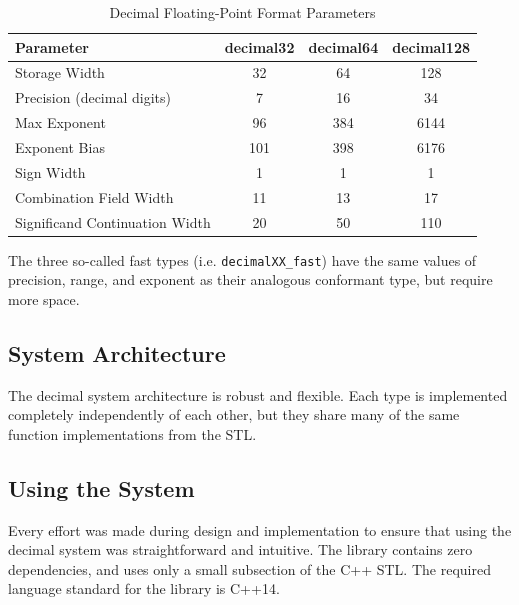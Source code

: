 \documentclass[acmsmall]{acmart}
\newcommand{\code}[1]{\texttt{#1}}
\begin{document}
\begin{table}[H]
\centering
\begin{tabular}{|l|c|c|c|}
\hline
\textbf{Parameter} & \textbf{decimal32} & \textbf{decimal64} & \textbf{decimal128} \\
\hline
Storage Width & 32 & 64 & 128 \\
\hline
Precision (decimal digits) & 7 & 16 & 34 \\
\hline
Max Exponent & 96 & 384 & 6144 \\
\hline
Exponent Bias & 101 & 398 & 6176 \\
\hline
Sign Width & 1 & 1 & 1 \\
\hline
Combination Field Width & 11 & 13 & 17 \\
\hline
Significand Continuation Width & 20 & 50 & 110 \\
\hline
\end{tabular}
\caption{Decimal Floating-Point Format Parameters}
\label{tab:decimal_params}
\end{table}

The three so-called fast types (i.e. \code{decimalXX\_fast}) have the same values of precision, range, and exponent as their analogous conformant type, but require more space.

\subsection{System Architecture}

The decimal system architecture is robust and flexible.
Each type is implemented completely independently of each other, but they share many of the same function implementations from the STL.

\subsection{Using the System}

Every effort was made during design and implementation to ensure that using the decimal system was straightforward and intuitive.
The library contains zero dependencies, and uses only a small subsection of the C++ STL.
The required language standard for the library is C++14.
\end{document}
